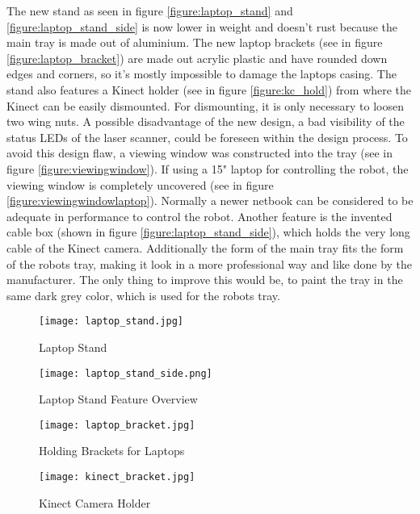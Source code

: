 The new stand as seen in figure \vref{figure:laptop_stand} and \vref{figure:laptop_stand_side} is now lower in
weight and doesn't rust because the main tray is made out of aluminium. The new laptop brackets 
(see in figure \vref{figure:laptop_bracket}) are made out acrylic plastic and have rounded down edges and corners, 
so it's mostly impossible to damage the laptops casing. The stand also features a Kinect holder 
(see in figure \vref{figure:kc_hold}) from where the Kinect can be easily dismounted. For dismounting, 
it is only necessary to loosen two wing nuts. A possible disadvantage of the new design, a bad visibility of
the status LEDs of the laser scanner, could be foreseen within the design process. 
To avoid this design flaw, a viewing window was constructed into the tray (see in figure \vref{figure:viewingwindow}). 
If using a 15" laptop for controlling the robot, the viewing window is completely uncovered 
(see in figure \vref{figure:viewingwindowlaptop}). Normally a newer netbook can be considered to be 
adequate in performance to control the robot. Another feature is the invented cable box 
(shown in figure \vref{figure:laptop_stand_side}), which holds the very long cable of the Kinect camera. 
Additionally the form of the main tray fits the form of the robots tray, making it look in a more professional 
way and like done by the manufacturer. The only thing to improve this would be, to paint the tray in the 
same dark grey color, which is used for the robots tray.

\begin{figure}[htp]
\begin{center}
  \texttt{[image: laptop\_stand.jpg]}
  \caption{Laptop Stand}
  \label{figure:laptop_stand}
\end{center}
\end{figure}
\begin{figure}[htp]
\begin{center}
  \texttt{[image: laptop\_stand\_side.png]}
  \caption{Laptop Stand Feature Overview}
  \label{figure:laptop_stand_side}
\end{center}
\end{figure}


\begin{figure}[htp]
\begin{center}
  \texttt{[image: laptop\_bracket.jpg]}
  \caption{Holding Brackets for Laptops}
  \label{figure:laptop_bracket}
\end{center}
\end{figure}
\begin{figure}[htp]
\begin{center}
  \texttt{[image: kinect\_bracket.jpg]}
  \caption{Kinect Camera Holder}
  \label{figure:kc_hold}
\end{center}
\end{figure}

